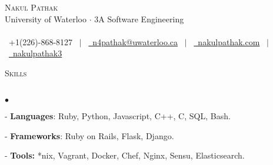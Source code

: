 \documentclass[11pt]{article}
\newcommand{\lineunder}{\vspace*{-8pt} \\ \hspace*{-18pt} \hrulefill \\}
\newcommand{\header}[1]{{\hspace*{-15pt}\vspace*{6pt} \textsc{#1}} \vspace*{-6pt} \lineunder }
\newenvironment{achievements}{\begin{list}{$\bullet$}{\topsep 0pt \itemsep -1.5pt \leftmargin 5pt}}{\vspace*{4pt}\end{list}}
\begin{document}
\small
\smallskip
\vspace*{-45pt}

\begin{center}
  {\Huge \scshape {Nakul Pathak}} \\
  \vspace*{6pt}
{\fontsize{10}{1}\selectfont University of Waterloo $\cdot$ 3A Software Engineering} \\
\vspace{-4pt}
\hspace*{-18pt} \hrulefill \\
\vspace{2pt}
\hspace*{-13pt} \faPhone \  +1(226)-868-8127 \ $|$ \  \href{mailto:n4pathak@uwaterloo.ca}{\faEnvelope \ n4pathak@uwaterloo.ca} \  $|$ \  \href{http://nakulpathak.com}{\faGlobe \ nakulpathak.com}  \ $|$ \   \href{https://github.com/nakulpathak3}{\faGithub \ nakulpathak3}
\vspace{-5pt}
\end{center}

\vspace{4pt}

\header{\fontsize{11.1}{10}\selectfont Skills}
\begin{achievements}
\item[-] \textbf{Languages}: Ruby, Python, Javascript, C++, C, SQL, Bash.
\vspace{1pt}
\item[-] \textbf{Frameworks}: Ruby on Rails, Flask, Django.
\vspace{1pt}
\item[-] \textbf{Tools:} *nix, Vagrant, Docker, Chef, Nginx, Sensu, Elasticsearch.
\end{achievements}

\vspace{5pt}
\end{document}
